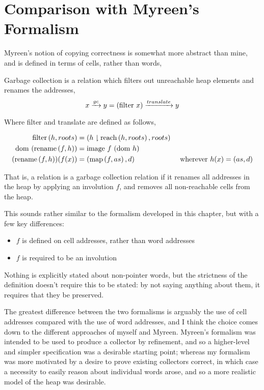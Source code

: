 \section{Comparison with Myreen's Formalism}
\label{sec:copying-myreen}

Myreen's\cite{Myreen10} notion of copying correctness is somewhat more
abstract than mine, and is defined in terms of cells, rather than
words,

\begin{definition}
  \label{def:c-myreen-correctness}
  Garbage collection is a relation which filters out unreachable heap
  elements and renames the addresses, \[x \gc y = (\mathrm{filter}~x)
  \translate y\]

  Where filter and translate are defined as follows,

  \begin{prooftree}
  \end{prooftree}

  \begin{align*}
    \filter{h}{roots} &= (h \restrict \reach{h}{roots}, roots)\\
    \dom~(\rename{f}{h}) &= \mathrm{image}~f~(\dom~h)\\
    (\rename{f}{h})(f(x)) &= (\map{f}{as}, d) & \mbox{ wherever } h(x)
    = (as, d)\\
  \end{align*}
\end{definition}

That is, a relation is a garbage collection relation if it renames all
addresses in the heap by applying an involution $f$, and removes all
non-reachable cells from the heap.

This sounds rather similar to the formalism developed in this chapter,
but with a few key differences:

\begin{itemize}
\item $f$ is defined on cell addresses, rather than word addresses
\item $f$ is required to be an involution
\end{itemize}

Nothing is explicitly stated about non-pointer words, but the
strictness of the definition doesn't require this to be stated: by not
saying anything about them, it requires that they be preserved.

The greatest difference between the two formalisms is arguably the use
of cell addresses compared with the use of word addresses, and I think
the choice comes down to the different approaches of myself and
Myreen. Myreen's formalism was intended to be used to produce a
collector by refinement, and so a higher-level and simpler
specification was a desirable starting point; whereas my formalism was
more motivated by a desire to prove existing collectors correct, in
which case a necessity to easily reason about individual words arose,
and so a more realistic model of the heap was desirable.

